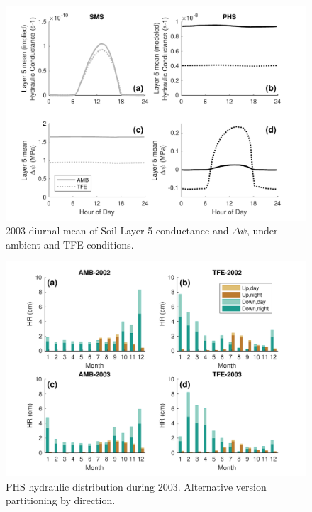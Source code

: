 \documentclass[draft,linenumbers]{agujournal}
\begin{document}
\clearpage   
  \begin{figure}[h]
     \centering
     \includegraphics[width=30pc]{../figs3/k.pdf}
     \caption{2003 diurnal mean of Soil Layer 5 conductance and $\Delta\psi$, under ambient and TFE conditions. 
     }
     \label{supp:cond2}
  \end{figure}
  
      \begin{figure}[h]
     \centering
     \includegraphics[width=30pc]{../figs3/hr2}
     \caption{PHS hydraulic distribution during 2003. Alternative version partitioning by direction.}
     \label{supp:hr}
  \end{figure}
  \clearpage
\end{document}
